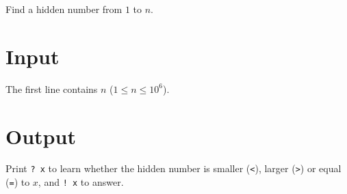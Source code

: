 
Find a hidden number from $1$ to $n$.

\section*{Input}
The first line contains $n$ ($1 \le n \le 10^6$).

\section*{Output}
Print \texttt{? x} to learn whether the hidden number is smaller (\texttt{<}), larger (\texttt{>}) or equal (\texttt{=}) to $x$, and \texttt{! x} to answer.
